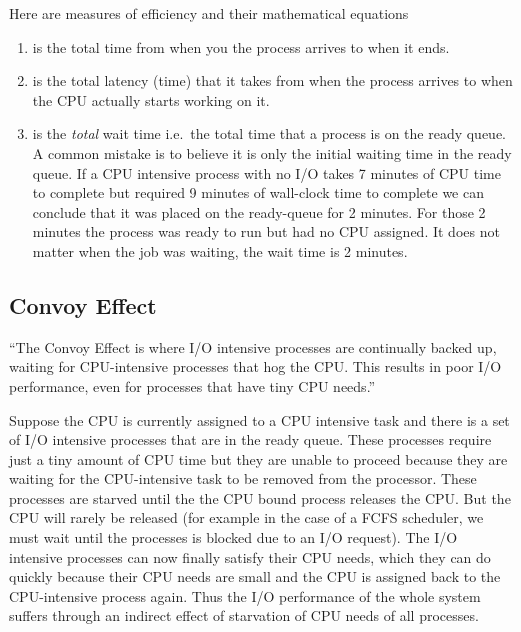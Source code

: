 Here are measures of efficiency and their mathematical equations

\begin{enumerate}
  \item {} is the total time from when you the process arrives to when it ends. 
  \item {} is the total latency (time) that it takes from when the process arrives to when the CPU actually starts working on it. 
  \item {} is the \emph{total} wait time i.e.~the total time that a process is on the ready queue. A common mistake is to believe it is only the initial waiting time in the ready queue. If a CPU intensive process with no I/O takes 7 minutes of CPU time to complete but required 9 minutes of wall-clock time to complete we can conclude that it was placed on the ready-queue for 2 minutes. For those 2 minutes the process was ready to run but had no CPU assigned. It does not matter when the job was waiting, the wait time is 2 minutes. 

\end{enumerate}

\subsection{Convoy Effect}

``The Convoy Effect is where I/O intensive processes are continually backed up, waiting for CPU-intensive processes that hog the CPU. This results in poor I/O performance, even for processes that have tiny CPU needs.''

Suppose the CPU is currently assigned to a CPU intensive task and there is a set of I/O intensive processes that are in the ready queue. These processes require just a tiny amount of CPU time but they are unable to proceed because they are waiting for the CPU-intensive task to be removed from the processor. These processes are starved until the the CPU bound process releases the CPU. But the CPU will rarely be released (for example in the case of a FCFS scheduler, we must wait until the processes is blocked due to an I/O request). The I/O intensive processes can now finally satisfy their CPU needs, which they can do quickly because their CPU needs are small and the CPU is assigned back to the CPU-intensive process again. Thus the I/O performance of the whole system suffers through an indirect effect of starvation of CPU needs of all processes.

